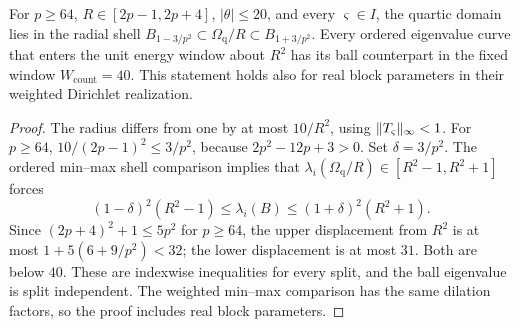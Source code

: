 \begin{lemma}\label{inf:quartic-count-window}
For $p\ge64$, $R\in[2p-1,2p+4]$, $|\theta|\le20$, and every
$\varsigma\in I$, the quartic domain lies in the radial shell
$B_{1-3/p^2}\subset\Omega_{\mathrm q}/R\subset B_{1+3/p^2}$.
Every ordered eigenvalue curve that enters the unit energy
window about $R^2$ has its ball counterpart in the fixed window
$W_{\mathrm{count}}=40$. This statement holds also for real block
parameters in their weighted Dirichlet realization.
\end{lemma}
\begin{proof}
The radius differs from one by at most $10/R^2$, using
$\lVert T_\varsigma\rVert_\infty<1$. For $p\ge64$,
$10/(2p-1)^2\le3/p^2$, because
$2p^2-12p+3>0$. Set $\delta=3/p^2$.
The ordered min--max shell comparison implies that
$\lambda_i(\Omega_{\mathrm q}/R)\in[R^2-1,R^2+1]$ forces
\[
 (1-\delta)^2(R^2-1)\le\lambda_i(B)
              \le(1+\delta)^2(R^2+1).
\]
Since $(2p+4)^2+1\le5p^2$ for $p\ge64$, the upper displacement
from $R^2$ is at most
$1+5(6+9/p^2)<32$; the lower displacement is at most $31$.
Both are below $40$. These are indexwise inequalities for every
split, and the ball eigenvalue is split independent.
The weighted min--max comparison has the same dilation factors,
so the proof includes real block parameters.
\end{proof}

